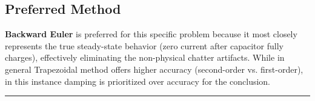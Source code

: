 \subsection{Preferred Method}

\textbf{Backward Euler} is preferred for this specific problem because it most closely represents the true steady-state behavior (zero current after capacitor fully charges), effectively eliminating the non-physical chatter artifacts. While in general Trapezoidal method offers higher accuracy (second-order vs. first-order), in this instance damping is prioritized over accuracy for the conclusion.

\vspace{1em}
\noindent\rule{\textwidth}{0.4pt}
